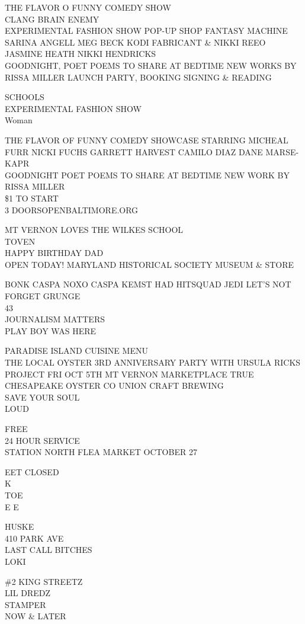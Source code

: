 \documentclass[10pt,letterpaper]{article}
\begin{document}
THE FLAVOR O FUNNY COMEDY SHOW\\
CLANG BRAIN ENEMY\\
EXPERIMENTAL FASHION SHOW POP{-}UP SHOP FANTASY MACHINE SARINA ANGELL MEG BECK KODI FABRICANT \& NIKKI  REEO JASMINE HEATH NIKKI HENDRICKS\\
GOODNIGHT, POET POEMS TO SHARE AT BEDTIME NEW WORKS BY RISSA MILLER LAUNCH PARTY, BOOKING SIGNING \& READING

SCHOOLS\\
EXPERIMENTAL FASHION SHOW\\
Woman

THE FLAVOR OF FUNNY COMEDY SHOWCASE STARRING MICHEAL FURR NICKI FUCHS GARRETT HARVEST CAMILO DIAZ DANE MARSE{-}KAPR\\
GOODNIGHT POET POEMS TO SHARE AT BEDTIME NEW WORK BY RISSA MILLER\\
\$1 TO START\\
3 DOORSOPENBALTIMORE.ORG

MT VERNON LOVES THE WILKES SCHOOL\\
TOVEN\\
HAPPY BIRTHDAY DAD\\
OPEN TODAY!  MARYLAND HISTORICAL SOCIETY MUSEUM \& STORE

BONK CASPA NOXO CASPA KEMST HAD HITSQUAD JEDI LET'S NOT FORGET GRUNGE\\
43\\
JOURNALISM MATTERS\\
PLAY BOY WAS HERE

PARADISE ISLAND CUISINE MENU\\
THE LOCAL OYSTER 3RD ANNIVERSARY PARTY WITH URSULA RICKS PROJECT FRI OCT 5TH MT VERNON MARKETPLACE TRUE CHESAPEAKE OYSTER CO UNION CRAFT BREWING\\
SAVE YOUR SOUL\\
LOUD

FREE\\
24 HOUR SERVICE\\
STATION NORTH FLEA MARKET OCTOBER 27

EET CLOSED\\
K\\
TOE\\
E E

HUSKE\\
410 PARK AVE\\
LAST CALL BITCHES\\
LOKI

\#2 KING STREETZ\\
LIL DREDZ\\
STAMPER\\
NOW \& LATER
\end{document}

